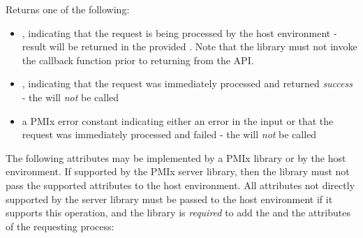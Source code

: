 \begin{arglist}
\end{arglist}

Returns one of the following:

\begin{itemize}
    \item {}, indicating that the request is being processed by the host environment - result will be returned in the provided . Note that the library must not invoke the callback function prior to returning from the \ac{API}.
    \item {}, indicating that the request was immediately processed and returned \textit{success} - the  will \textit{not} be called
    \item a PMIx error constant indicating either an error in the input or that the request was immediately processed and failed - the  will \textit{not} be called
\end{itemize}

\optattrstart
The following attributes may be implemented by a \ac{PMIx} library or by the host environment. If supported by the \ac{PMIx} server library, then the library must not pass the supported attributes to the host environment. All attributes not directly supported by the server library must be passed to the host environment if it supports this operation, and the library is \textit{required} to add the  and the  attributes of the requesting process:


